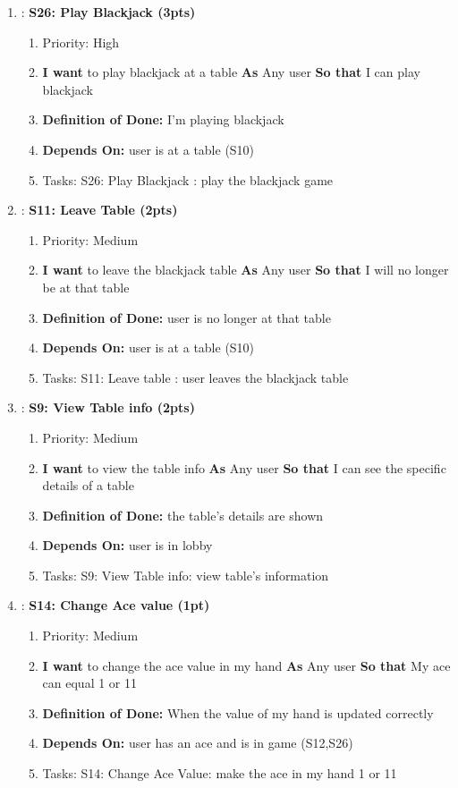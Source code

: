 \begin{enumerate}
    \item: \textbf{S26: Play Blackjack (3pts)}
    \begin{enumerate}
        \item Priority: High
        \item \textbf{I want} to play blackjack at a table \textbf{As} Any user \textbf{So that} I can play blackjack
        \item \textbf{Definition of Done:} I'm playing blackjack
        \item \textbf{Depends On:} user is at a table (S10)
        \item Tasks: S26: Play Blackjack : play the blackjack game
    \end{enumerate}

     \item: \textbf{S11: Leave Table (2pts)}
    \begin{enumerate}
        \item Priority: Medium
        \item \textbf{I want} to leave the blackjack table \textbf{As} Any user \textbf{So that} I will no longer be at that table
        \item \textbf{Definition of Done:} user is no longer at that table
        \item \textbf{Depends On:} user is at a table (S10)
        \item Tasks: S11: Leave table : user leaves the blackjack table
    \end{enumerate}

    \item: \textbf{S9: View Table info (2pts)}
    \begin{enumerate}
        \item Priority: Medium
        \item \textbf{I want} to view the table info \textbf{As} Any user \textbf{So that} I can see the specific details of a table
        \item \textbf{Definition of Done:} the table's details are shown
        \item \textbf{Depends On:} user is in lobby
        \item Tasks: S9: View Table info: view table's information
    \end{enumerate}

    \item: \textbf{S14: Change Ace value (1pt)}
    \begin{enumerate}
        \item Priority: Medium
        \item \textbf{I want} to change the ace value in my hand \textbf{As} Any user \textbf{So that} My ace can equal 1 or 11
        \item \textbf{Definition of Done:} When the value of my hand is updated correctly
        \item \textbf{Depends On:} user has an ace and is in game (S12,S26)
        \item Tasks: S14: Change Ace Value: make the ace in my hand 1 or 11
    \end{enumerate}
\end{enumerate}

